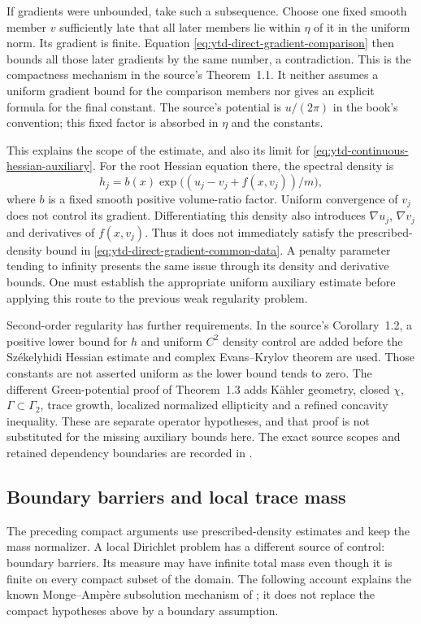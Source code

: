If gradients were unbounded, take such a subsequence.
Choose one fixed smooth member $v$ sufficiently late that
all later members lie within $\eta$ of it in the uniform
norm. Its gradient is finite. Equation
\eqref{eq:ytd-direct-gradient-comparison} then bounds all
those later gradients by the same number, a contradiction.
This is the compactness mechanism in the source's Theorem~1.1.
It neither assumes a uniform gradient bound for the comparison
members nor gives an explicit formula for the final constant.
The source's potential is $u/(2\pi)$ in the book's convention;
this fixed factor is absorbed in $\eta$ and the constants.

This explains the scope of the estimate, and also its limit
for \eqref{eq:ytd-continuous-hessian-auxiliary}.
For the root Hessian equation there, the spectral density is
\[
 h_j=b(x)\exp\bigl((u_j-v_j+f(x,v_j))/m\bigr),
\]
where $b$ is a fixed smooth positive volume-ratio factor.
Uniform convergence of $v_j$ does not control its gradient.
Differentiating this density also introduces $\nabla u_j$,
$\nabla v_j$ and derivatives of $f(x,v_j)$.
Thus it does not immediately satisfy the prescribed-density
bound in \eqref{eq:ytd-direct-gradient-common-data}.
A penalty parameter tending to infinity presents the same
issue through its density and derivative bounds.
One must establish the appropriate uniform auxiliary estimate
before applying this route to the previous weak regularity
problem.

Second-order regularity has further requirements. In the
source's Corollary~1.2, a positive lower bound for $h$ and
uniform $C^2$ density control are added before the
Sz\'ekelyhidi Hessian estimate and complex Evans--Krylov
theorem are used. Those constants are not asserted uniform
as the lower bound tends to zero.
The different Green-potential proof of Theorem~1.3 adds
K\"ahler geometry, closed $\chi$, $\Gamma\subset\Gamma_2$,
trace growth, localized normalized ellipticity and a
refined concavity inequality. These are separate operator
hypotheses, and that proof is not substituted for the missing
auxiliary bounds here. The exact source scopes and retained
dependency boundaries are recorded in
.

\subsection{Boundary barriers and local trace mass}
\label{sec:ytd-boundary-mass-buffers}

The preceding compact arguments use prescribed-density estimates
and keep the mass normalizer. A local Dirichlet problem has a
different source of control: boundary barriers. Its measure may
have infinite total mass even though it is finite on every compact
subset of the domain. The following account explains the known
Monge--Amp\`ere subsolution mechanism of
\cite{Nguyen20HolderSubsolutionIIPublished}; it does not replace
the compact hypotheses above by a boundary assumption.

